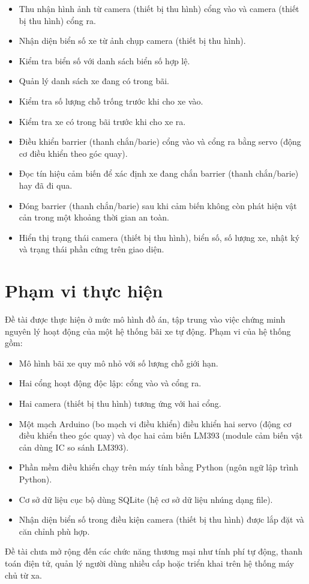 \documentclass[a4paper,14pt]{extreport}
\begin{document}
\begin{itemize}[leftmargin=2em]
  \item Thu nhận hình ảnh từ camera (thiết bị thu hình) cổng vào và camera (thiết bị thu hình) cổng ra.
  \item Nhận diện biển số xe từ ảnh chụp camera (thiết bị thu hình).
  \item Kiểm tra biển số với danh sách biển số hợp lệ.
  \item Quản lý danh sách xe đang có trong bãi.
  \item Kiểm tra số lượng chỗ trống trước khi cho xe vào.
  \item Kiểm tra xe có trong bãi trước khi cho xe ra.
  \item Điều khiển barrier (thanh chắn/barie) cổng vào và cổng ra bằng servo (động cơ điều khiển theo góc quay).
  \item Đọc tín hiệu cảm biến để xác định xe đang chắn barrier (thanh chắn/barie) hay đã đi qua.
  \item Đóng barrier (thanh chắn/barie) sau khi cảm biến không còn phát hiện vật cản trong một khoảng thời gian an toàn.
  \item Hiển thị trạng thái camera (thiết bị thu hình), biển số, số lượng xe, nhật ký và trạng thái phần cứng trên giao diện.
\end{itemize}

\section{Phạm vi thực hiện}

Đề tài được thực hiện ở mức mô hình đồ án, tập trung vào việc chứng minh nguyên lý hoạt động của một hệ thống bãi xe tự động. Phạm vi của hệ thống gồm:

\begin{itemize}[leftmargin=2em]
  \item Mô hình bãi xe quy mô nhỏ với số lượng chỗ giới hạn.
  \item Hai cổng hoạt động độc lập: cổng vào và cổng ra.
  \item Hai camera (thiết bị thu hình) tương ứng với hai cổng.
  \item Một mạch Arduino (bo mạch vi điều khiển) điều khiển hai servo (động cơ điều khiển theo góc quay) và đọc hai cảm biến LM393 (module cảm biến vật cản dùng IC so sánh LM393).
  \item Phần mềm điều khiển chạy trên máy tính bằng Python (ngôn ngữ lập trình Python).
  \item Cơ sở dữ liệu cục bộ dùng SQLite (hệ cơ sở dữ liệu nhúng dạng file).
  \item Nhận diện biển số trong điều kiện camera (thiết bị thu hình) được lắp đặt và căn chỉnh phù hợp.
\end{itemize}
Đề tài chưa mở rộng đến các chức năng thương mại như tính phí tự động, thanh toán điện tử, quản lý người dùng nhiều cấp hoặc triển khai trên hệ thống máy chủ từ xa.
\end{document}
